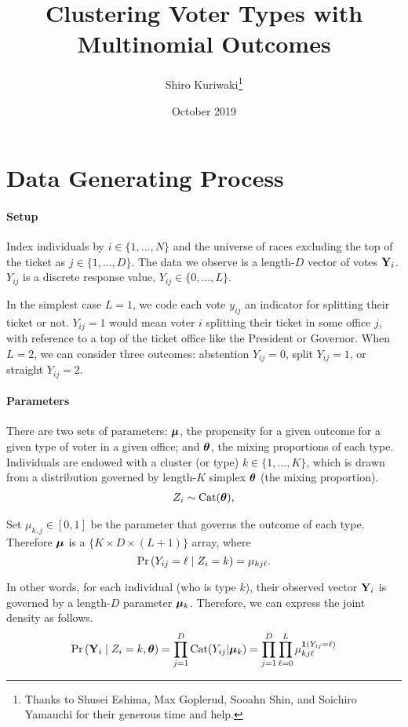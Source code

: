 \documentclass[11pt]{article}
\title{ \Large\textbf{Clustering Voter Types with Multinomial Outcomes}}
\author{\normalsize  Shiro Kuriwaki\thanks{Thanks to Shusei Eshima, Max Goplerud, Sooahn Shin, and Soichiro Yamauchi for their generous time and help.} }
\date{\normalsize October 2019}
\begin{document}
\maketitle

\onehalfspacing


\section{Data Generating Process}


\paragraph{Setup}

Index individuals by \(i \in \{1, ..., N\}\) and the universe of races
excluding the top of the ticket as \(j \in \{1, ..., D\}\). The data we
observe is a length-\(D\) vector of votes \(\mathbf{Y}_i\). \(Y_{ij}\) is a
discrete response value, \(Y_{ij} \in \{0, ..., L\}\). 

In the simplest case \(L = 1\), we code each vote \(y_{ij}\) an indicator for splitting their ticket or not. \(Y_{ij} = 1\) would mean voter \(i\) splitting their ticket in some office \(j\), with reference to a top of the ticket office like the President or Governor. When \(L = 2\), we can consider three outcomes: abstention \(Y_{ij} = 0\), split \(Y_{ij} = 1\), or straight \(Y_{ij} = 2\).


\paragraph{Parameters}


There are two sets of parameters: \(\bm{\mu}\), the propensity for a given outcome for a given type of voter in a given office; and \(\bm{\theta}\), the mixing proportions of each type.  Individuals are endowed with a cluster (or type) \(k \in \{1, ..., K\}\), which is drawn from a distribution governed by length-\(K\) simplex \(\bm{\theta}\) (the mixing proportion).
\begin{align*}
Z_i \sim  \text{Cat}(\bm{\theta}),
\end{align*}

Set \(\mu_{k, j} \in [0, 1]\) be the parameter that governs the outcome of each type. Therefore \(\bm{\mu}\) is a \(\{K \times D \times (L + 1)\}\) array, where 
 \[\mathbb{\Pr}\left(Y_{ij} = \ell \mid Z_i = k\right) = \mu_{kj\ell}.\]

In other words, for each individual (who is  type \(k\)), their observed vector \(\mathbf{Y}_{i}\) is governed by a length-\(D\) parameter \(\bm{\mu}_{k}\). Therefore, we can express the joint density as follows. 
\begin{align}
\mathbb{\Pr}\left(\mathbf{Y}_{i} \mid Z_{i} = k, \bm{\theta}\right) = \prod^{D}_{j = 1} \text{Cat}(Y_{ij} | \bm{\mu}_k) = \prod^{D}_{j = 1}\prod^{L}_{\ell=0} \mu_{kj\ell}^{\bm{1}\left(Y_{ij} = \ell\right)}
\end{align}
\end{document}

